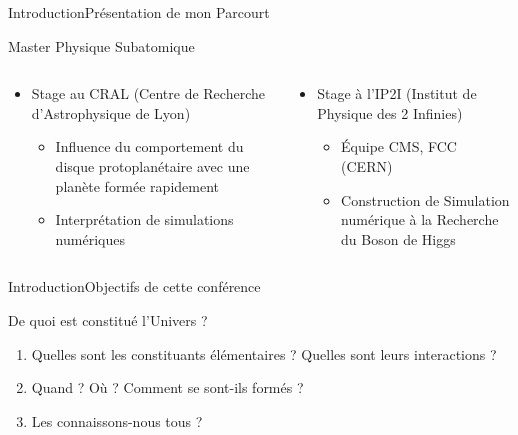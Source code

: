 \documentclass[handout,8pt]{beamer} %
\begin{document}
\begin{frame}{Introduction}{Présentation de mon Parcourt}
\begin{block}{Master Physique Subatomique}
\begin{columns}
			\begin{column}{0.45\textwidth}
				\begin{itemize}
					\item Stage au CRAL (Centre de Recherche d'Astrophysique de Lyon)
					\begin{itemize}
						\item Influence du comportement du disque protoplanétaire avec une planète formée rapidement
						\item Interprétation de simulations numériques
					\end{itemize}
				\end{itemize}
			\end{column}
			\pause
			\begin{column}{0.45\textwidth}
				\begin{itemize}
					\item Stage à l'IP2I (Institut de Physique des 2 Infinies)
					\begin{itemize}
						\item Équipe CMS, FCC (CERN)
						\item Construction de Simulation numérique à la Recherche du Boson de Higgs
					\end{itemize}
				\end{itemize}
			\end{column}
		\end{columns}
	\end{block}
\end{frame}

\begin{frame}{Introduction}{Objectifs de cette conférence}
	\begin{center}
		\begin{Large}
			De quoi est constitué l'Univers ?
		\end{Large}
	\end{center}
	
	\begin{enumerate}
		\pause
		\item Quelles sont les constituants élémentaires ? Quelles sont leurs interactions ?
		\pause
		\item Quand ? Où ? Comment se sont-ils formés ?
		\pause
		\item Les connaissons-nous tous ? 
	\end{enumerate}
\end{frame}
\end{document}
